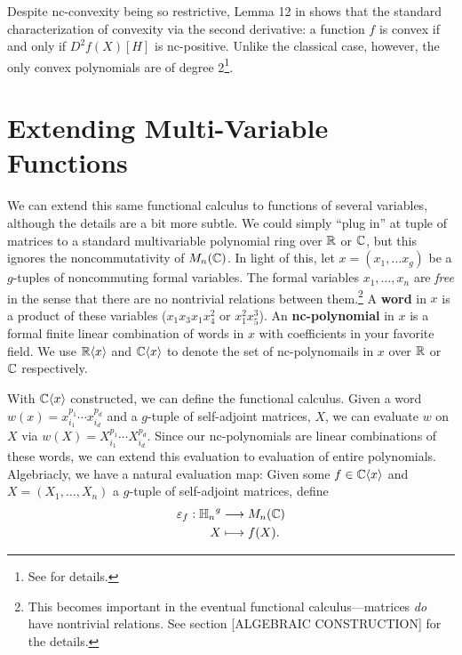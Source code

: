 Despite nc-convexity being so restrictive, Lemma 12 in \cite{heltonFree2013}
shows that the standard characterization of convexity via the second
derivative: a function \(f\) is convex if and only if \(D^{2}f(X)[H]\) is
nc-positive. Unlike the classical case, however, the only convex polynomials are
of degree 2\footnote{See \cite{heltonFree2013} for details.}.

\section{Extending Multi-Variable Functions}%
\label{sec:ExtMuliVarFun}

We can extend this same functional calculus to functions of several variables,
although the details are a bit more subtle. We could simply ``plug in'' at tuple
of matrices to a standard multivariable polynomial ring over \(\mathbb{R} \) or
\(\mathbb{C} \), but this ignores the noncommutativity of \(M_n(\mathbb{C})\). In light of this,
let \(x = (x_1 , \dots x_g)\) be a
\(g\)-tuples of noncommuting formal variables. The formal variables
\(x_1, \dots , x_n\) are \emph{free} in the sense that there are no nontrivial
relations between them.\footnote{This becomes important in the eventual
  functional calculus---matrices \emph{do} have nontrivial relations. See
  section [ALGEBRAIC CONSTRUCTION] for the details.}
A \textbf{word} in \(x\) is a product of these
variables (\eg \(x_1x_3x_1x_4^2\) or \(x_1^2x_5^3\)). An \textbf{nc-polynomial}
in \(x\) is a formal finite linear combination of words in \(x\) with
coefficients in your favorite field. We use \(\mathbb{R} \langle x \rangle\) and
\(\mathbb{C} \langle x \rangle\) to denote the set of nc-polynomails in \(x\) over
\(\mathbb{R} \) or \(\mathbb{C} \) respectively.

With \(\mathbb{C} \langle x \rangle \) constructed, we can define the functional
calculus. Given a word \(w(x) = x_{i_1}^{p_1}\cdots x_{i_d}^{p_d}\) and a
\(g\)-tuple of self-adjoint matrices, \(X\), we can evaluate \(w\) on \(X\) via
\(w(X) = X_{i_1}^{p_1}\cdots X_{i_d}^{p_d}\). Since our nc-polynomials are
linear combinations of these words, we can extend this evaluation to evaluation
of entire polynomials. Algebriacly, we have a natural evaluation map:
Given some \(f \in \mathbb{C} \langle x \rangle \) and
\(X = \left( X_1, \dots ,X_n \right) \) a
\(g\)-tuple of self-adjoint matrices, define
\begin{align*}
  \varepsilon_f: {\mathbb{H}_n}^g &\longrightarrow M_n(\mathbb{C}) \\
             X &\longmapsto f(X)
.\end{align*}

